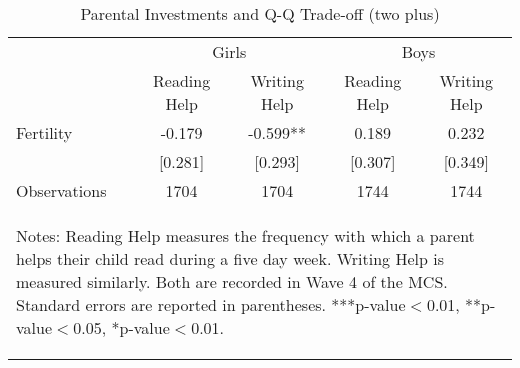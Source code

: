 \begin{table}[htbp]\centering
\def\sym#1{\ifmmode^{#1}\else\(^{#1}\)\fi}
\caption{Parental Investments and Q-Q Trade-off (two plus)}
\begin{tabular}{l*{4}{c}}
\toprule
                    &\multicolumn{2}{c}{Girls}      &\multicolumn{2}{c}{Boys}       \\\cmidrule(lr){2-3}\cmidrule(lr){4-5}
                    &Reading Help   &Writing Help   &Reading Help   &Writing Help   \\
\midrule
Fertility           &      -0.179   &      -0.599** &       0.189   &       0.232   \\
                    &     [0.281]   &     [0.293]   &     [0.307]   &     [0.349]   \\
\midrule
Observations        &        1704   &        1704   &        1744   &        1744   \\
\bottomrule\multicolumn{5}{p{12.6cm}}{\begin{footnotesize}
Notes: Reading Help measures the frequency with which a   
parent helps their child read during a five day week.     
Writing Help is measured similarly. Both are recorded in  
Wave 4 of the MCS. Standard errors are reported in parentheses. ***p-value$<$0.01, **p-value$<$0.05, *p-value$<$0.01.                                
\end{footnotesize}}\end{tabular}\end{table}
